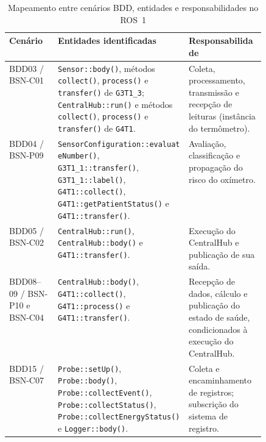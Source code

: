 \begin{table}[htbp]
\centering
\caption{Mapeamento entre cenários BDD, entidades e responsabilidades no ROS~1}
\label{tab:res-mapeamento-bdd}
\scriptsize
\begin{tabularx}{\linewidth}{@{}p{0.19\linewidth}X p{0.30\linewidth}@{}}
\toprule
\textbf{Cenário} & \textbf{Entidades identificadas} & \textbf{Responsabilidade} \\
\midrule
BDD03 / BSN-C01 & \texttt{Sensor::body()}, métodos \texttt{collect()}, \texttt{process()} e \texttt{transfer()} de \texttt{G3T1\_3}; \texttt{CentralHub::run()} e métodos \texttt{collect()}, \texttt{process()} e \texttt{transfer()} de \texttt{G4T1}. & Coleta, processamento, transmissão e recepção de leituras (instância do termômetro). \\
\addlinespace
BDD04 / BSN-P09 & \texttt{SensorConfiguration::evaluateNumber()}, \texttt{G3T1\_1::transfer()}, \texttt{G3T1\_1::label()}, \texttt{G4T1::collect()}, \texttt{G4T1::getPatientStatus()} e \texttt{G4T1::transfer()}. & Avaliação, classificação e propagação do risco do oxímetro. \\
\addlinespace
BDD05 / BSN-C02 & \texttt{CentralHub::run()}, \texttt{CentralHub::body()} e \texttt{G4T1::transfer()}. & Execução do CentralHub e publicação de sua saída. \\
\addlinespace
BDD08--09 / BSN-P10 e BSN-C04 & \texttt{CentralHub::body()}, \texttt{G4T1::collect()}, \texttt{G4T1::process()} e \texttt{G4T1::transfer()}. & Recepção de dados, cálculo e publicação do estado de saúde, condicionados à execução do CentralHub. \\
\addlinespace
BDD15 / BSN-C07 & \texttt{Probe::setUp()}, \texttt{Probe::body()}, \texttt{Probe::collectEvent()}, \texttt{Probe::collectStatus()}, \texttt{Probe::collectEnergyStatus()} e \texttt{Logger::body()}. & Coleta e encaminhamento de registros; subscrição do sistema de registro. \\
\bottomrule
\end{tabularx}
\end{table}


